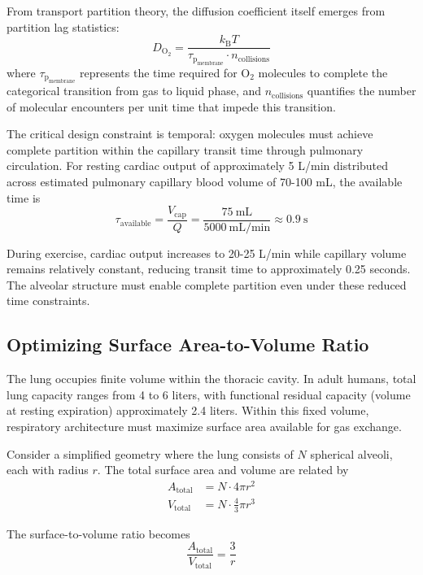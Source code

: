\documentclass[12pt,a4paper]{article}
\theoremstyle{remark}
\newcommand{\kB}{k_{\mathrm{B}}}
\newcommand{\taulag}{\tau_{\mathrm{p}}}
\begin{document}
From transport partition theory, the diffusion coefficient itself emerges from partition lag statistics:
\begin{equation}
D_{\mathrm{O}_{2}} = \frac{\kB T}{\taulag_{\mathrm{membrane}} \cdot n_{\mathrm{collisions}}}
\end{equation}
where $\taulag_{\mathrm{membrane}}$ represents the time required for O$_{2}$ molecules to complete the categorical transition from gas to liquid phase, and $n_{\mathrm{collisions}}$ quantifies the number of molecular encounters per unit time that impede this transition.

The critical design constraint is temporal: oxygen molecules must achieve complete partition within the capillary transit time through pulmonary circulation. For resting cardiac output of approximately 5 L/min distributed across estimated pulmonary capillary blood volume of 70-100 mL, the available time is
\begin{equation}
\tau_{\mathrm{available}} = \frac{V_{\mathrm{cap}}}{Q} = \frac{75~\mathrm{mL}}{5000~\mathrm{mL/min}} \approx 0.9~\mathrm{s}
\end{equation}

During exercise, cardiac output increases to 20-25 L/min while capillary volume remains relatively constant, reducing transit time to approximately 0.25 seconds. The alveolar structure must enable complete partition even under these reduced time constraints.

\subsection{Optimizing Surface Area-to-Volume Ratio}

The lung occupies finite volume within the thoracic cavity. In adult humans, total lung capacity ranges from 4 to 6 liters, with functional residual capacity (volume at resting expiration) approximately 2.4 liters. Within this fixed volume, respiratory architecture must maximize surface area available for gas exchange.

Consider a simplified geometry where the lung consists of $N$ spherical alveoli, each with radius $r$. The total surface area and volume are related by
\begin{align}
A_{\mathrm{total}} &= N \cdot 4\pi r^{2} \\
V_{\mathrm{total}} &= N \cdot \frac{4}{3}\pi r^{3}
\end{align}

The surface-to-volume ratio becomes
\begin{equation}
\frac{A_{\mathrm{total}}}{V_{\mathrm{total}}} = \frac{3}{r}
\end{equation}
\end{document}
